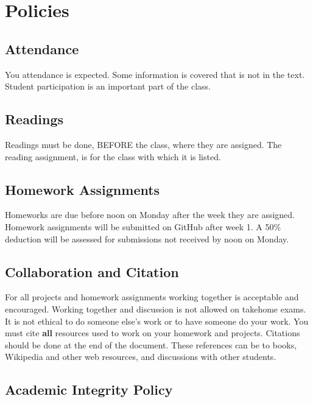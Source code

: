 \documentclass[11pt]{article} %
\begin{document}
\section{Policies}

  \subsection{Attendance}
  
    You attendance is expected. 
    Some information is covered that is not in the text. 
    Student participation is an important part of the class. 
  
  \subsection{Readings}
  
    Readings must be done, BEFORE the class, where they are assigned. 
    The reading assignment, is for the class with which it is listed. 
  
  \subsection{Homework Assignments}
  
    Homeworks are due before noon on Monday after the week they are assigned.
    Homework assignments will be submitted on GitHub after week 1.
    A 50\% deduction will be assessed for submissions not received by noon on Monday. 
  
  \subsection{Collaboration and Citation}
  
    For all projects and homework assignments working together is acceptable and encouraged. 
    Working together and discussion is not allowed on takehome exams.
    It is not ethical to do someone else's work or to have someone do your work. 
    You must cite \textbf{all} resources used to work on your homework and projects. 
    Citations should be done at the end of the document. 
    These references can be to books, Wikipedia and other web resources, and discussions with other students. 
  
  \subsection{Academic Integrity Policy}
  
\end{document}
